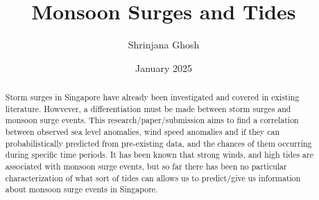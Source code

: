 \documentclass{article}
\begin{document}
\title{Monsoon Surges and Tides}
\author{Shrinjana Ghosh}
\date{January 2025}
\vfill





\maketitle

\begin{abstract}
    Storm surges in Singapore have already been investigated and covered in existing literature. Howvever, a differentiation must be made
    between storm surges and monsoon surge events. This research/paper/submission aims to find a correlation between observed sea level anomalies, wind speed anomalies
    and if they can probabilistically predicted from pre-existing data, and the chances of them occurring during specific time periods. It has been known that strong winds, and high tides are associated with monsoon surge events, but so far there has been no particular characterization of what sort of tides can allows us to predict/give us information about monsoon surge events in Singapore. 
\end{abstract}
\end{document}
